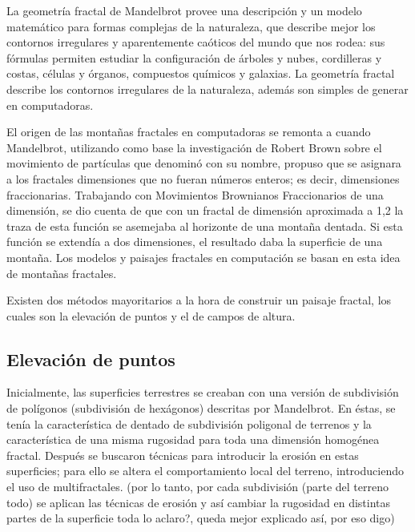 \documentclass[12pt]{article} %
\begin{document}
La geometría fractal de Mandelbrot provee una descripción y un modelo matemático para formas complejas de la naturaleza, que describe mejor los contornos irregulares y aparentemente caóticos del mundo que nos rodea: sus fórmulas permiten estudiar la configuración de árboles y nubes, cordilleras y costas, células y órganos, compuestos químicos y galaxias. La geometría fractal describe los contornos irregulares de la naturaleza, además son simples de generar en computadoras.

El origen de las montañas fractales en computadoras se remonta a cuando Mandelbrot, utilizando como base la investigación de Robert Brown sobre el movimiento de partículas que denominó con su nombre, propuso que se asignara a los fractales dimensiones que no fueran números enteros; es decir, dimensiones fraccionarias. Trabajando con Movimientos Brownianos Fraccionarios de una dimensión, se dio cuenta de que con un fractal de dimensión aproximada a 1,2 la traza de esta función se asemejaba al horizonte de una montaña dentada. Si esta función se extendía a dos dimensiones, el resultado daba la superficie de una montaña.  Los modelos y paisajes fractales en computación se basan en esta idea de montañas fractales.

Existen dos métodos mayoritarios a la hora de construir un paisaje fractal, los cuales son la elevación de puntos y el de campos de altura.%



\subsection{Elevación de puntos} %
Inicialmente, las superficies terrestres se creaban con una versión de subdivisión de polígonos (subdivisión de hexágonos) descritas por Mandelbrot. En éstas, se tenía la característica de dentado de subdivisión poligonal de terrenos y la característica de una misma rugosidad para toda una dimensión homogénea fractal. Después se buscaron técnicas para introducir la erosión en estas superficies; para ello se altera el comportamiento local del terreno, introduciendo el uso de multifractales. (por lo tanto, por cada subdivisión (parte del terreno todo) se aplican las técnicas de erosión y así cambiar la rugosidad en distintas partes de la superficie toda lo aclaro?, queda mejor explicado así, por eso digo)
\end{document}
